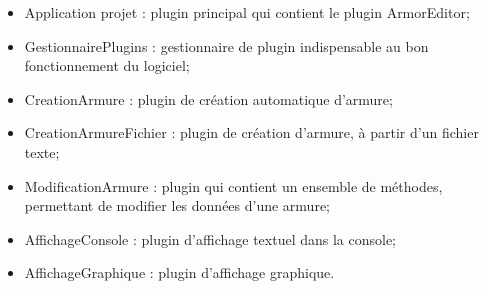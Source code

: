 \begin{itemize}
	\item Application projet : plugin principal qui contient le plugin ArmorEditor;
	\item GestionnairePlugins : gestionnaire de plugin indispensable au bon fonctionnement du logiciel;
	\item CreationArmure : plugin de création automatique d'armure;
	\item CreationArmureFichier : plugin de création d'armure, à partir d'un fichier texte;
	\item ModificationArmure : plugin qui contient un ensemble de méthodes, permettant de modifier les données d'une armure;
	\item AffichageConsole : plugin d'affichage textuel dans la console;
	\item AffichageGraphique : plugin d'affichage graphique.
\end{itemize}

